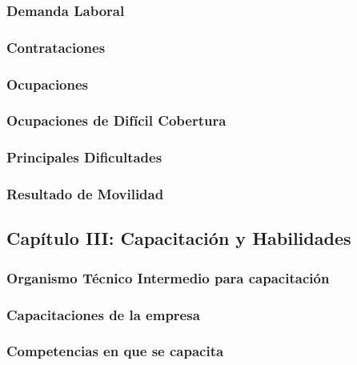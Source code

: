 \documentclass[
  11pt,
]{article}
\begin{document}
\subsubsection{Demanda Laboral}\label{demanda-laboral}

\subsubsection{Contrataciones}\label{contrataciones}

\subsubsection{Ocupaciones}\label{ocupaciones}

\subsubsection{Ocupaciones de Difícil
Cobertura}\label{ocupaciones-de-difuxedcil-cobertura}

\subsubsection{Principales Dificultades}\label{principales-dificultades}

\subsubsection{Resultado de Movilidad}\label{resultado-de-movilidad}

\subsection{Capítulo III: Capacitación y
Habilidades}\label{capuxedtulo-iii-capacitaciuxf3n-y-habilidades}

\subsubsection{Organismo Técnico Intermedio para
capacitación}\label{organismo-tuxe9cnico-intermedio-para-capacitaciuxf3n}

\subsubsection{Capacitaciones de la
empresa}\label{capacitaciones-de-la-empresa}

\subsubsection{Competencias en que se
capacita}\label{competencias-en-que-se-capacita}
\end{document}
